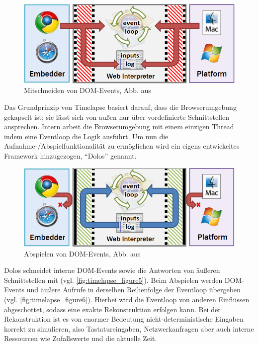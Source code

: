 \begin{figure}
\centering
\vspace{-\baselineskip}
\includegraphics[width=\linewidth]{img/03_methoden/timelapse_figure5.png}
\caption{Mitschneiden von DOM-Events, Abb. aus \cite{TimelapsePaper}}
\label{fig:timelapse_figure5}
\end{figure}

Das Grundprinzip von Timelapse basiert darauf, dass die Browserumgebung gekapselt ist; sie lässt sich von außen nur über vordefinierte Schnittstellen ansprechen. Intern arbeit die Browserumgebung mit einem einzigen Thread indem eine Eventloop die Logik ausführt. Um nun die Aufnahme-/Abspielfunktionalität zu ermöglichen wird ein eigens entwickeltes Framework hinzugezogen, \enquote{Dolos} genannt.

\begin{figure}
\centering
\vspace{-\baselineskip}
\includegraphics[width=\linewidth]{img/03_methoden/timelapse_figure6.png}
\caption{Abspielen von DOM-Events, Abb. aus \cite{TimelapsePaper}}
\label{fig:timelapse_figure6}
\end{figure}

Dolos schneidet interne DOM-Events sowie die Antworten von äußeren Schnittstellen mit (vgl. \autoref{fig:timelapse_figure5}). Beim Abspielen werden DOM-Events und äußere Aufrufe in derselben Reihenfolge der Eventloop übergeben (vgl. \autoref{fig:timelapse_figure6}). Hierbei wird die Eventloop von anderen Einflüssen abgeschottet, sodass eine exakte Rekonstruktion erfolgen kann. Bei der Rekonstruktion ist es von enormer Bedeutung nicht-deterministische Eingaben korrekt zu simulieren, also Tastatureingaben, Netzwerkanfragen aber auch interne Ressourcen wie Zufallswerte und die aktuelle Zeit.

